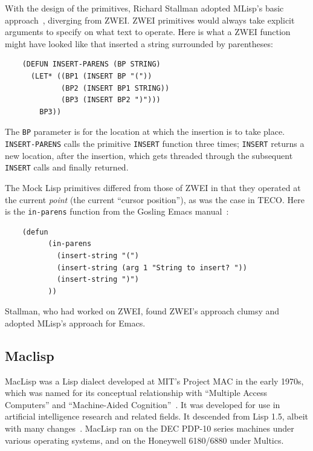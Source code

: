 \documentclass[format=acmsmall,screen]{acmart}
\begin{document}
With the design of the primitives, Richard Stallman adopted MLisp's
basic approach~\cite{Stallman2018-personal}, diverging from ZWEI.
ZWEI primitives would always take explicit arguments to specify on what
text to operate.  Here is what a ZWEI function might have looked
like that inserted a string surrounded by parentheses:
%
\begin{verbatim}
    (DEFUN INSERT-PARENS (BP STRING)
      (LET* ((BP1 (INSERT BP "("))
             (BP2 (INSERT BP1 STRING))
             (BP3 (INSERT BP2 ")")))
        BP3))
\end{verbatim}
%
The \texttt{BP} parameter is for the location at which the insertion
is to take place.  \texttt{INSERT-PARENS} calls the primitive
\texttt{INSERT} function three times; \texttt{INSERT} returns a new
location, after the insertion, which gets threaded through the
subsequent \texttt{INSERT} calls and finally returned.

The Mock Lisp primitives differed from those of ZWEI in that they operated
at the current \emph{point} (the current ``cursor position''), as was the
case in TECO.  Here is the \texttt{in-parens} function from the Gosling
Emacs manual~\cite{Gosling1981}:
%
\begin{verbatim}
    (defun
          (in-parens
            (insert-string "(")
            (insert-string (arg 1 "String to insert? "))
            (insert-string ")")
          ))
\end{verbatim}
%
Stallman, who had worked on ZWEI, found ZWEI's approach clumsy and
adopted MLisp's approach for Emacs.

\subsection{Maclisp}

MacLisp was a Lisp dialect developed at MIT's Project MAC in the early
1970s, which was named for its conceptual relationship with ``Multiple
Access Computers'' and ``Machine-Aided Cognition''~\cite{Pitman1983}.
It was developed for use in artificial intelligence research and
related fields.  It descended from Lisp 1.5, albeit with many changes~\cite{Moon1974}.
MacLisp ran on the DEC PDP-10 series machines under various operating
systems, and on the Honeywell 6180/6880 under Multics.
\end{document}
